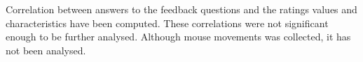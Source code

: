 
\label{sec:additional_data}
Correlation between answers to the feedback questions and the ratings values and characteristics have been computed. These correlations were not significant enough to be further analysed. Although mouse movements was collected, it has not been analysed.